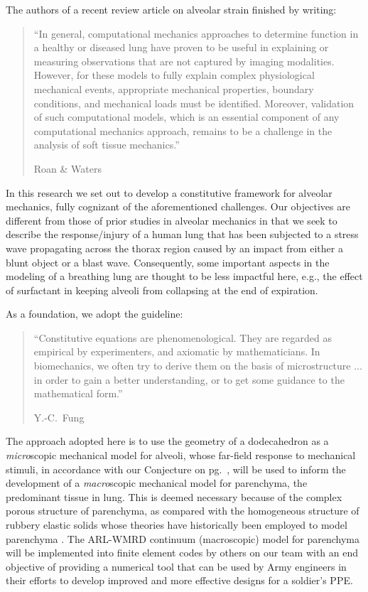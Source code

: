 The authors of a recent review article on alveolar strain finished by writing:
\begin{quotation}
    \noindent\small ``In general, computational mechanics approaches to determine function in a healthy or diseased lung have proven to be useful in explaining or measuring observations that are not captured by imaging modalities. However, for these models to fully explain complex physiological mechanical events, appropriate mechanical properties, boundary conditions, and mechanical loads must be identified. Moreover, validation of such computational models, which is an essential component of any computational mechanics approach, remains to be a challenge in the analysis of soft tissue mechanics.''
    
    \nopagebreak
    \mbox{} \hfill Roan \& Waters \cite[pg.~L633]{RoanWaters11} \normalsize
\end{quotation}
In this research we set out to develop a constitutive framework for alveolar mechanics, fully cognizant of the aforementioned challenges.  Our objectives are different from those of prior studies in alveolar mechanics in that we seek to describe the response\slash injury of a human lung that has been subjected to a stress wave propagating across the thorax region caused by an impact from either a blunt object or a blast wave.  Consequently, some important aspects in the modeling of a breathing lung are thought to be less impactful here, e.g., the effect of surfactant in keeping alveoli from collapsing at the end of expiration.

As a foundation, we adopt the guideline:
\begin{quotation}
	\noindent\small ``Constitutive equations are phenomenological. They are regarded as empirical by experimenters, and axiomatic by mathematicians.  In biomechanics, we often try to derive them on the basis of micro\-structure $\ldots$ in order to gain a better understanding, or to get some guidance to the mathematical form.''
	
	\nopagebreak
	\mbox{} \hfill Y.-C.~Fung \cite[pg.~431]{Fung90} \normalsize
\end{quotation}
The approach adopted here is to use the geometry of a dodecahedron as a \textit{micro}\-scopic mechanical model for alveoli, whose far-field response to mechanical stimuli, in accordance with our Conjecture on pg.~\pageref{conjecture}, will be used to inform the development of a \textit{macro\/}scopic mechanical model for parenchyma, \cite{ClaytonFreed19,ClaytonFreed20} the predominant tissue in lung.  This is deemed necessary because of the complex porous structure of parenchyma, as compared with the homo\-geneous structure of rubbery elastic solids whose theories have historically been employed to model parenchyma \cite{Fung75,Fungetal78,Vawteretal79,Fung88}.  The ARL-WMRD continuum (macroscopic) model for parenchyma \cite{ClaytonFreed19} will be implemented into finite element codes by others on our team with an end objective of providing a numerical tool that can be used by Army engineers in their efforts to develop improved and more effective designs for a soldier's PPE. 

